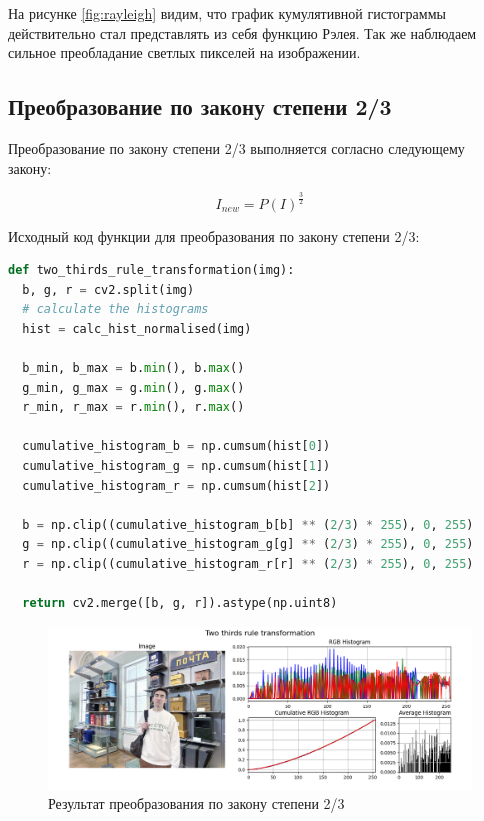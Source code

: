 На рисунке \ref{fig:rayleigh} видим, что график кумулятивной гистограммы действительно стал представлять из себя функцию Рэлея. Так же наблюдаем сильное преобладание светлых пикселей на изображении. 

\subsection{Преобразование по закону степени 2/3}

Преобразование по закону степени 2/3 выполняется согласно следующему закону:

\begin{equation}
  I_{new} = P(I)^{\frac{3}{2}}
\end{equation}

Исходный код функции для преобразования по закону степени 2/3:

\begin{lstlisting}[language=Python]
def two_thirds_rule_transformation(img):
  b, g, r = cv2.split(img)
  # calculate the histograms
  hist = calc_hist_normalised(img)

  b_min, b_max = b.min(), b.max()
  g_min, g_max = g.min(), g.max()
  r_min, r_max = r.min(), r.max()

  cumulative_histogram_b = np.cumsum(hist[0]) 
  cumulative_histogram_g = np.cumsum(hist[1])
  cumulative_histogram_r = np.cumsum(hist[2])

  b = np.clip((cumulative_histogram_b[b] ** (2/3) * 255), 0, 255)
  g = np.clip((cumulative_histogram_g[g] ** (2/3) * 255), 0, 255)
  r = np.clip((cumulative_histogram_r[r] ** (2/3) * 255), 0, 255)
  
  return cv2.merge([b, g, r]).astype(np.uint8)
\end{lstlisting}

\begin{figure}[H]
    \centering
    \includegraphics[width=\textwidth]{../results/Two thirds rule transformation.png}
    \caption{Результат преобразования по закону степени 2/3}
    \label{fig:two_thirds}
\end{figure}

